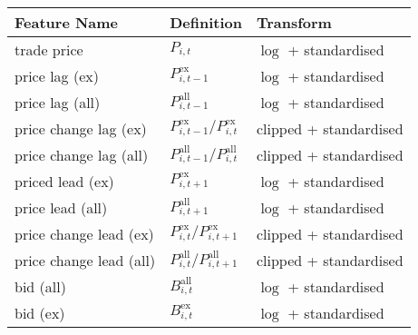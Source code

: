 \begin{table}[H]
    \centering
    \begin{threeparttable}
        \begin{tabular}{@{}lll@{}}
            \toprule
            Feature Name            & Definition                                                                                       & Transform \\ \midrule
            trade price             & $P_{i, t}$                                                                                       & $\log$ + standardised \\
            price lag (ex)          & $P_{i, t-1}^{\text{ex}}$\tnote{*}                                                                & $\log$ + standardised          \\
            price lag (all)         & $P_{i, t-1}^{\text{all}}$\tnote{*}                                                               & $\log$ + standardised          \\
            price change lag (ex)   & $P_{i, t-1}^{\text{ex}}/P_{i, t}^{\text{ex}}$\tnote{*}                                           & clipped + standardised          \\
            price change lag (all)  & $P_{i, t-1}^{\text{all}}/P_{i, t}^{\text{all}}$\tnote{*}                                         & clipped + standardised          \\
            priced lead (ex)        & $P_{i, t+1}^{\text{ex}}$\tnote{*}                                                                & $\log$ + standardised          \\
            price lead (all)        & $P_{i, t+1}^{\text{all}}$\tnote{*}                                                               & $\log$ + standardised          \\
            price change lead (ex)  & $P_{i, t}^{\text{ex}}/P_{i, t+1}^{\text{ex}}$\tnote{*}                                           & clipped + standardised          \\
            price change lead (all) & $P_{i, t}^{\text{all}}/P_{i, t+1}^{\text{all}}$\tnote{*}                                         & clipped + standardised          \\
            bid (all)               & $B_{i, t}^{\text{all}}$                                                                          & $\log$ + standardised          \\
            bid (ex)                & $B_{i, t}^{\text{ex}}$                                                                           & $\log$ + standardised          \\

\end{tabular}
\end{threeparttable}
\end{table}
